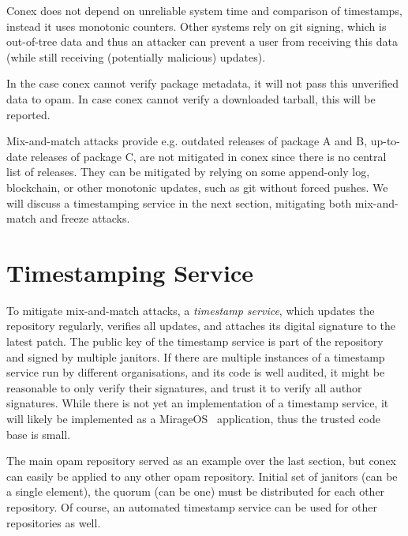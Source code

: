 \documentclass[nocopyrightspace]{sigplanconf}
\newcommand{\TODO}[1]{\textbf{[TODO: #1]}}
\begin{document}
Conex does not depend on unreliable system time and comparison of timestamps, instead it uses monotonic counters.
Other systems rely on git signing, which is out-of-tree data and thus an attacker can prevent a user from receiving this data (while still receiving (potentially malicious) updates).

In the case conex cannot verify package metadata, it will not pass this unverified data to opam.
In case conex cannot verify a downloaded tarball, this will be reported.

Mix-and-match attacks provide e.g. outdated releases of package A and B, up-to-date releases of package C, are not mitigated in conex since there is no central list of releases.
They can be mitigated by relying on some append-only log, blockchain, or other monotonic updates, such as git without forced pushes.
We will discuss a timestamping service in the next section, mitigating both mix-and-match and freeze attacks.

\section{Timestamping Service} \label{sec:shortcuts}


To mitigate mix-and-match attacks, a \emph{timestamp service}, which updates the repository regularly, verifies all updates, and attaches its digital signature to the latest patch.
The public key of the timestamp service is part of the repository and signed by multiple janitors.
If there are multiple instances of a timestamp service run by different organisations, and its code is well audited, it might be reasonable to only verify their signatures, and trust it to verify all author signatures.
While there is not yet an implementation of a timestamp service, it will likely be implemented as a MirageOS~\cite{mirage,nqsb-tls} application, thus the trusted code base is small.

The main opam repository served as an example over the last section, but conex can easily be applied to any other opam repository.
Initial set of janitors (can be a single element), the quorum (can be one) must be distributed for each other repository.
Of course, an automated timestamp service can be used for other repositories as well.
\end{document}

